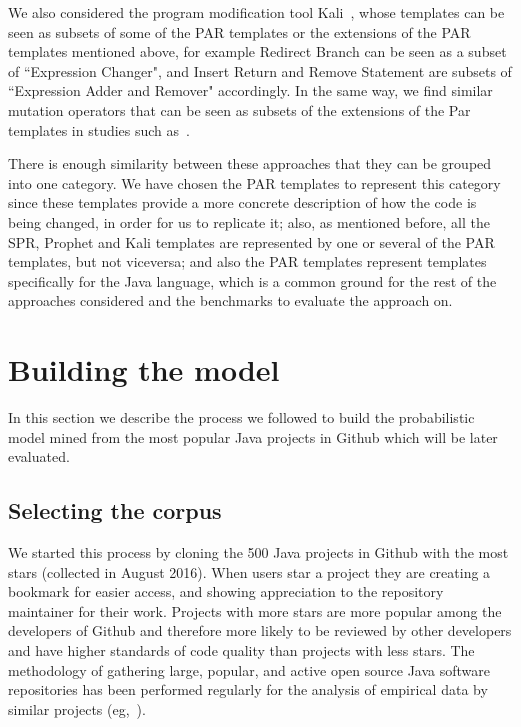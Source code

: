 \documentclass[conference]{IEEEtran}
\begin{document}
We also considered the program modification tool Kali~\cite{Qi15}, whose templates can be seen as subsets of some of the PAR templates or the extensions of the PAR templates mentioned above, for example Redirect Branch can be seen as a subset of ``Expression Changer", and Insert Return and Remove Statement are subsets of ``Expression Adder and Remover" accordingly. In the same way, we find similar mutation operators that can be seen as subsets of the extensions of the Par templates in studies such as~\cite{Offutt96,Offutt06}.

There is enough similarity between these approaches that they can be grouped 
into one category. We have chosen the PAR templates to represent this category 
since these templates provide a more concrete description of how the code is 
being changed, in order for us to replicate it; also, as mentioned before, all the SPR, Prophet and Kali templates are represented by one or several of the PAR templates, but not viceversa; and also the PAR templates represent templates specifically for the Java language, which is a common ground for the rest of the 
approaches considered and the benchmarks to evaluate the approach on.


\section{Building the model} \label{buildingTheModel}
In this section we describe the process we followed to build the probabilistic model mined from the most popular Java projects in Github which will be later evaluated.
\subsection{Selecting the corpus}
We started this process by cloning the 500 Java projects in Github 
with the most stars (collected in August 2016). When users star a project they are creating a bookmark for 
easier access, and showing appreciation to the repository maintainer for their 
work. Projects with more stars are more popular among the developers of Github 
and therefore more likely to be reviewed by other developers and have higher 
standards of code quality than projects with less stars. The methodology of 
gathering large,
popular, and active open source Java software repositories has been performed 
regularly for the analysis of empirical data by similar projects (eg,~\cite{Ray14}). 
\end{document}
